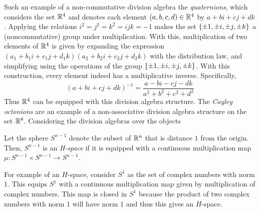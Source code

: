 \documentclass[../sean_thesis.tex]{subfiles}
\begin{document}
Such an example of a non-commutative division algebra the \emph{quaternions}, which considers the set $\mathbb{R}^4$ and denotes each element $(a,b,c,d) \in \mathbb{R}^4$ by $a + bi + cj + dk$. Applying the relations $i^2=j^2=k^2=ijk=-1$ makes the set $\left\{\pm 1, \pm i, \pm j, \pm k\right\}$ a (noncommutative) group under multiplication. With this, multiplication of two elements of $\mathbb{R}^4$ is given by expanding the expression $(a_1 + b_1i + c_1j + d_1k)(a_2 + b_2i + c_2j + d_2k)$ with the distribution law, and simplifying using the operations of the group $\left\{\pm 1, \pm i, \pm j, \pm k\right\}$. With this construction, every element indeed has a multiplicative inverse. Specifically,
\begin{equation*}
	(a + bi + cj + dk)^{-1} = \frac{a - bi - cj - dk}{a^2+b^2+c^2+d^2}
\end{equation*}
Thus $\mathbb{R}^4$ can be equipped with this division algebra structure. The \emph{Cayley octonions} are an example of a non-associative division algebra structure on the set $\mathbb{R}^8$. Considering the division algebras over the objects

\begin{example}
\end{example}

\begin{definition}
	Let the sphere $S^{n-1}$ denote the subset of $\mathbb{R}^n$ that is distance $1$ from the origin. Then, $S^{n-1}$ is an \emph{H-space} if it is equipped with a continuous multiplication map $\mu: S^{n-1} \times S^{n-1} \to S^{n-1}$.
\end{definition}

For example of an $H$-space, consider $S^1$ as the set of complex numbers with norm $1$. This equips $S^1$ with a continuous multiplication map given by multiplication of complex numbers. This map is closed in $S^1$ because the product of two complex numbers with norm $1$ will have norm $1$ and thus this gives an $H$-space.

\begin{example}
\end{example}

\begin{example}
\end{example}
\end{document}
